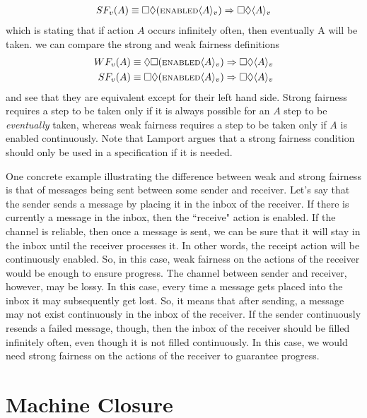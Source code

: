 \documentclass[11pt, oneside]{article}   	%
\begin{document}
\begin{align*}
SF_v(A) \equiv \square \lozenge ( \text{\scriptsize ENABLED} \langle A \rangle _v) \Rightarrow \square \Diamond \langle A \rangle _v
\end{align*}
which is stating that if action $A$ occurs infinitely often, then eventually A will be taken. we can compare the strong and weak fairness definitions
\begin{align*}
WF_v(A) &\equiv 
\Diamond \square (\text{\scriptsize ENABLED} \langle A \rangle _v) \Rightarrow \square \Diamond \langle A \rangle _v \\
SF_v(A) &\equiv \square \lozenge (\text{\scriptsize ENABLED} \langle A \rangle _v ) \Rightarrow \square \Diamond \langle A \rangle _v
\end{align*}
and see that they are equivalent except for their left hand side. Strong fairness requires a step to be taken only if it is always possible for an $A$ step to be \textit{eventually} taken, whereas weak fairness requires a step to be taken only if $A$ is enabled continuously. Note that Lamport argues that a strong fairness condition should only be used in a specification if it is needed.

One concrete example illustrating the difference between weak and strong fairness is that of messages being sent between some sender and receiver. Let's say that the sender sends a message by placing it in the inbox of the receiver. If there is currently a message in the inbox, then the ``receive" action is enabled. If the channel is reliable, then once a message is sent, we can be sure that it will stay in the inbox until the receiver processes it. In other words, the receipt action will be continuously enabled. So, in this case, weak fairness on the actions of the receiver would be enough to ensure progress. The channel between sender and receiver, however, may be lossy. In this case, every time a message gets placed into the inbox it may subsequently get lost. So, it means that after sending, a message may not exist continuously in the inbox of the receiver. If the sender continuously resends a failed message, though, then the inbox of the receiver should be filled infinitely often, even though it is not filled continuously. In this case, we would need strong fairness on the actions of the receiver to guarantee progress.


\section*{Machine Closure}
\end{document}
